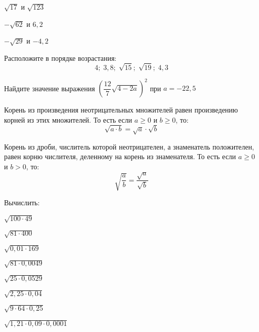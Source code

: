 \begin{class}[number=2]
\begin{listofex}[resume]
\begin{enumcols}[itemcolumns=4]
			\item \( \sqrt{17} \) и \( \sqrt{123} \)
			\item \( -\sqrt{62} \) и \( 6,2 \)
			\item \( -\sqrt{29} \) и \( -4,2 \)
		\end{enumcols}
		\item Расположите в порядке возрастания: \[ 4;\;3,8;\;\sqrt{15};\;\sqrt{19};\;4,3 \]
		\item Найдите значение выражения \( \left( \dfrac{12}{7}\sqrt{4-2a} \right)^2 \) при \( a=-22,5 \)
	\end{listofex}
\end{class}
%
%
\begin{class}[number=3]
	\begin{definit}
		Корень из произведения неотрицательных множителей равен произведению корней из этих множителей. То есть если \( a\ge0 \) и \( b\ge0 \), то: \[ \sqrt{a \cdot b}=\sqrt{a}\cdot\sqrt{b} \]
	\end{definit}
	\begin{definit}
		Корень из дроби,  числитель которой неотрицателен, а знаменатель положителен, равен корню числителя, деленному на корень из знаменателя. То есть если \( a\ge0 \) и \( b>0 \), то: \[ \sqrt{\dfrac{a}{b}}=\dfrac{\sqrt{a}}{\sqrt{b}} \]
	\end{definit}
	\begin{listofex}
		\item Вычислить:
		\begin{enumcols}[itemcolumns=3]
			\item \( \sqrt{100\cdot49} \)
			\item \( \sqrt{81\cdot400} \)
			\item \( \sqrt{0,01\cdot169} \)
			\item \( \sqrt{81\cdot0,0049} \)
			\item \( \sqrt{25\cdot0,0529} \)
			\item \( \sqrt{2,25\cdot0,04} \)
			\item \( \sqrt{9\cdot64\cdot0,25} \)
			\item \( \sqrt{1,21\cdot0,09\cdot0,0001} \)
			

\end{enumcols}
\end{listofex}
\end{class}
